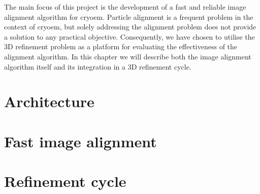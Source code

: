 \documentclass[../main.tex]{subfiles}
\begin{document}
The main focus of this project is the development of a fast and reliable image alignment algorithm for \gls{cryoem}. Particle alignment is a frequent problem in the context of \gls{cryoem}, but solely addressing the alignment problem does not provide a solution to any practical objective. Consequently, we have chosen to utilise the 3D refinement problem as a platform for evaluating the effectiveness of the alignment algorithm. In this chapter we will describe both the image alignment algorithm itself and its integration in a 3D refinement cycle.

\section{Architecture}


\section{Fast image alignment}


\section{Refinement cycle}

\end{document}
